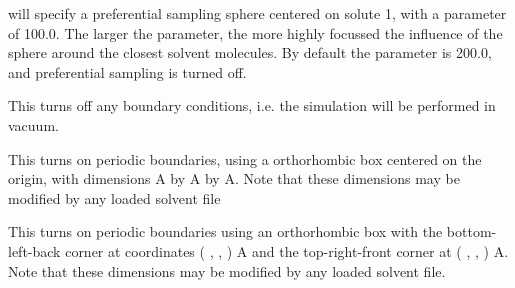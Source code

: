 \documentclass[letterpaper,10pt,english]{sphinxmanual}
\begin{document}
%
\begin{sphinxVerbatim}[commandchars=\\\{\}]
  
\end{sphinxVerbatim}

will specify a preferential sampling sphere centered on solute 1, with a parameter of 100.0. The larger the parameter, the more highly focussed the influence of the sphere around the closest solvent molecules. By default the parameter is 200.0, and preferential sampling is turned off.

\ignorespaces 
\def\sphinxLiteralBlockLabel{\label{\detokenize{protoms:index-41}}}
%
\begin{sphinxVerbatim}[commandchars=\\\{\}]
 
\end{sphinxVerbatim}

This turns off any boundary conditions, i.e. the simulation will be performed in vacuum.

%
\begin{sphinxVerbatim}[commandchars=\\\{\}]
    
\end{sphinxVerbatim}

This turns on periodic boundaries, using a orthorhombic box centered on the origin, with dimensions  A by  A by  A. Note that these dimensions may be modified by any loaded solvent file

%
\begin{sphinxVerbatim}[commandchars=\\\{\}]
       
\end{sphinxVerbatim}

This turns on periodic boundaries using an orthorhombic box with the bottom-left-back corner at coordinates ( ,  , ) A and the top-right-front corner at ( ,  , ) A. Note that these dimensions may be modified by any loaded solvent file.
\end{document}
